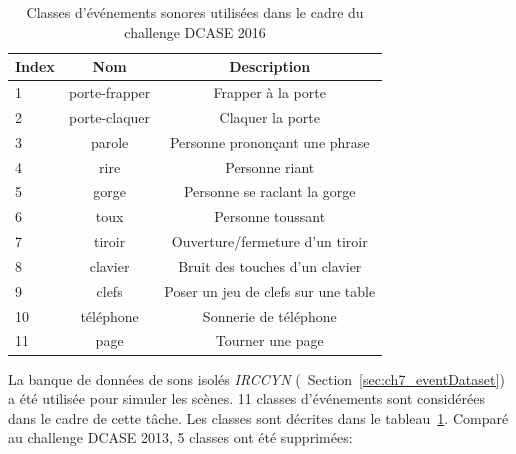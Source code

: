 \begin{table}[t]
\begin{center}
\begin{tabular}{lcc}
\textbf{Index} & \textbf{Nom}  & \textbf{Description}  \\ 
\hline
1   & porte-frapper & Frapper à la porte \\
2   & porte-claquer & Claquer la porte \\
3   & parole        & Personne  prononçant une phrase \\
4   & rire          & Personne riant  \\    
5   & gorge         & Personne se raclant la gorge  \\
6   & toux          & Personne toussant \\
7   & tiroir        & Ouverture/fermeture d'un tiroir \\
8   & clavier       & Bruit des touches d'un clavier \\
9   & clefs         & Poser un jeu de clefs sur une table \\    
10  & téléphone     & Sonnerie de téléphone \\
11  & page          & Tourner une page \\     
\hline      
\end{tabular}
\end{center}
\caption{Classes d'événements sonores utilisées dans le cadre du challenge DCASE 2016}
\label{tab:eventDCASE2016}
\end{table}

La banque de données de sons isolés \emph{IRCCYN} (\cf~Section~\ref{sec:ch7_eventDataset}) a été utilisée pour simuler les scènes. 11 classes d'événements sont considérées dans le cadre de cette tâche. Les classes sont décrites dans le tableau~\ref{tab:eventDCASE2016}. Comparé au challenge DCASE 2013, 5 classes ont été supprimées:


